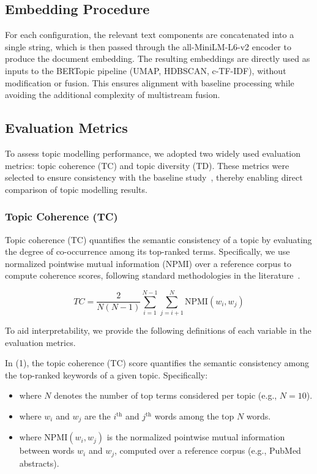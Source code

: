 \documentclass{ieeeaccess}
\begin{document}
\subsection{Embedding Procedure}

For each configuration, the relevant text components are concatenated into a single string, which is then passed through the all-MiniLM-L6-v2 encoder to produce the document embedding. The resulting embeddings are directly used as inputs to the BERTopic pipeline (UMAP, HDBSCAN, c-TF-IDF), without modification or fusion. This ensures alignment with baseline processing while avoiding the additional complexity of multistream fusion.

\subsection{Evaluation Metrics}

To assess topic modelling performance, we adopted two widely used evaluation metrics: topic coherence (TC) and topic diversity (TD). These metrics were selected to ensure consistency with the baseline study~\cite{lezhnina_depression_2023}, thereby enabling direct comparison of topic modelling results.

\subsubsection{Topic Coherence (TC)}

Topic coherence (TC) quantifies the semantic consistency of a topic by evaluating the degree of co-occurrence among its top-ranked terms. Specifically, we use normalized pointwise mutual information (NPMI) over a reference corpus to compute coherence scores, following standard methodologies in the literature~\cite{mimno_optimizing_2011,roder_exploring_2015}.

\begin{equation}
TC = \frac{2}{N(N-1)} \sum_{i=1}^{N-1} \sum_{j=i+1}^{N} \text{NPMI}(w_i, w_j)
\end{equation}

To aid interpretability, we provide the following definitions of each variable in the evaluation metrics.

In (1), the topic coherence (TC) score quantifies the semantic consistency among the top-ranked keywords of a given topic. Specifically:

\begin{itemize}
    \item where $N$ denotes the number of top terms considered per topic (e.g., $N = 10$).
    
    \item where $w_i$ and $w_j$ are the $i^{\text{th}}$ and $j^{\text{th}}$ words among the top $N$ words.
    
    \item where NPMI$(w_i, w_j)$ is the normalized pointwise mutual information between words $w_i$ and $w_j$, computed over a reference corpus (e.g., PubMed abstracts).
\end{itemize}
\end{document}
